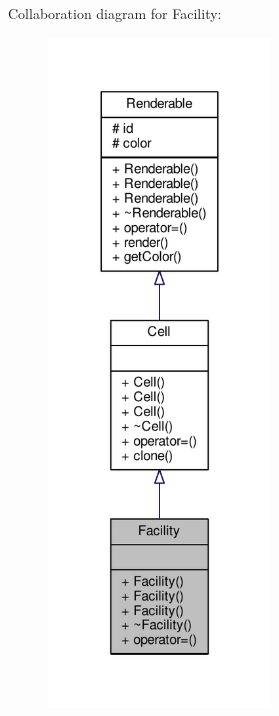 Collaboration diagram for Facility\+:
\nopagebreak
\begin{figure}[H]
\begin{center}
\leavevmode
\includegraphics[width=167pt]{classFacility__coll__graph}
\end{center}
\end{figure}
